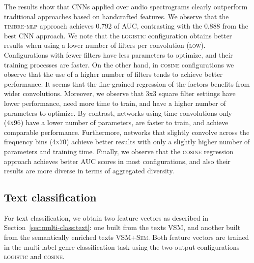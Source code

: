 
The results show that CNNs applied over audio spectrograms clearly outperform traditional approaches based on handcrafted features. 
We observe that the \textsc{timbre-mlp} approach achieves 0.792 of AUC, contrasting with the 0.888 from the best CNN approach.
We note that the \textsc{logistic} configuration obtains better results when using a lower number of filters per convolution (\textsc{low}). Configurations with fewer filters have less parameters to optimize, and their training processes are faster. 
On the other hand, in \textsc{cosine} configurations we observe that the use of a higher number of filters tends to achieve better performance. 
It seems that the fine-grained regression of the factors benefits from wider convolutions.
Moreover, we observe that 3x3 square filter settings have lower performance, need more time to train, and have a higher number of parameters to optimize.
By contrast, networks using time convolutions only (\textsc{4x96}) have a lower number of parameters, are faster to train, and achieve comparable performance. 
Furthermore, networks that slightly convolve across the frequency bins (\textsc{4x70}) achieve better results with only a slightly higher number of parameters and training time. 
Finally, we observe that the \textsc{cosine} regression approach achieves better AUC scores in most configurations, and also their results are more diverse in terms of aggregated diversity.



\subsection{Text classification}\label{sec:multi-class:textexp}

For text classification, we obtain two feature vectors as described in Section~\ref{sec:multi-class:text}: one built from the texts \textsc{VSM}, and another built from the semantically enriched texts \textsc{VSM+Sem}. 
Both feature vectors are trained in the multi-label genre classification task using the two output configurations \textsc{logistic} and \textsc{cosine}.

